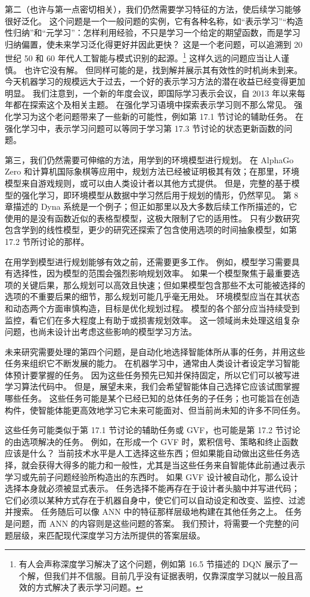 \documentclass[UTF8, 12pt, fontset=fandol, oneside]{ctexart}
\begin{document}
第二（也许与第一点密切相关），我们仍然需要学习特征的方法，使后续学习能够很好泛化。
这个问题是一个一般问题的实例，它有各种名称，如“表示学习”“构造性归纳”和“元学习”：怎样利用经验，不只是学习一个给定的期望函数，而是学习归纳偏置，使未来学习泛化得更好并因此更快？
这是一个老问题，可以追溯到 20 世纪 50 和 60 年代人工智能与模式识别的起源。\footnote{有人会声称深度学习解决了这个问题，例如第 16.5 节描述的 DQN 展示了一个解，但我们并不信服。目前几乎没有证据表明，仅靠深度学习就以一般且高效的方式解决了表示学习问题。}
这样久远的问题应当让人谨慎。
也许它没有解。
但同样可能的是，找到解并展示其有效性的时机尚未到来。
今天机器学习的规模远大于过去，一个好的表示学习方法的潜在收益已经变得更加明显。
我们注意到，一个新的年度会议，即国际学习表示会议，自 2013 年以来每年都在探索这个及相关主题。
在强化学习语境中探索表示学习则不那么常见。
强化学习为这个老问题带来了一些新的可能性，例如第 17.1 节讨论的辅助任务。
在强化学习中，表示学习问题可以等同于学习第 17.3 节讨论的状态更新函数的问题。

第三，我们仍然需要可伸缩的方法，用学到的环境模型进行规划。
在 AlphaGo Zero 和计算机国际象棋等应用中，规划方法已经被证明极其有效；在那里，环境模型来自游戏规则，或可以由人类设计者以其他方式提供。
但是，完整的基于模型的强化学习，即环境模型从数据中学习然后用于规划的情形，仍然罕见。
第 8 章描述的 Dyna 系统是一个例子；但正如那里以及大多数后续工作所描述的，它使用的是没有函数近似的表格型模型，这极大限制了它的适用性。
只有少数研究包含学到的线性模型，更少的研究还探索了包含使用选项的时间抽象模型，如第 17.2 节所讨论的那样。

在用学到模型进行规划能够有效之前，还需要更多工作。
例如，模型学习需要具有选择性，因为模型的范围会强烈影响规划效率。
如果一个模型聚焦于最重要选项的关键后果，那么规划可以高效且快速；但如果模型包含那些不太可能被选择的选项的不重要后果的细节，那么规划可能几乎毫无用处。
环境模型应当在其状态和动态两个方面审慎构造，目标是优化规划过程。
模型的各个部分应当持续受到监控，看它们在多大程度上有助于或损害规划效率。
这一领域尚未处理这组复杂问题，也尚未设计出考虑这些影响的模型学习方法。

未来研究需要处理的第四个问题，是自动化地选择智能体所从事的任务，并用这些任务来组织它不断发展的能力。
在机器学习中，通常由人类设计者设定学习智能体预计要掌握的任务。
因为这些任务预先已知并保持固定，所以它们可以被写进学习算法代码中。
但是，展望未来，我们会希望智能体自己选择它应该试图掌握哪些任务。
这些任务可能是某个已经已知的总体任务的子任务；也可能旨在创造构件，使智能体能更高效地学习它未来可能面对、但当前尚未知的许多不同任务。

这些任务可能类似于第 17.1 节讨论的辅助任务或 GVF，也可能是第 17.2 节讨论的由选项解决的任务。
例如，在形成一个 GVF 时，累积信号、策略和终止函数应该是什么？
当前技术水平是人工选择这些东西；但如果能自动做出这些任务选择，就会获得大得多的能力和一般性，尤其是当这些任务来自智能体此前通过表示学习或先前子问题经验所构造出的东西时。
如果 GVF 设计被自动化，那么设计选择本身就必须被显式表示。
任务选择不能再存在于设计者头脑中并写进代码；它们必须以某种方式存在于机器自身中，使它们可以自动设定和改变、监控、过滤并搜索。
任务随后可以像 ANN 中的特征那样层级地构建在其他任务之上。
任务是问题，而 ANN 的内容则是这些问题的答案。
我们预计，将需要一个完整的问题层级，来匹配现代深度学习方法所提供的答案层级。
\end{document}
